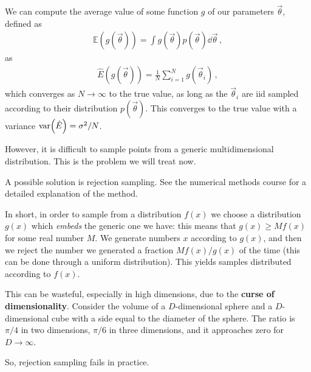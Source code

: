 \documentclass[main.tex]{subfiles}
\begin{document}

We can compute the average value of some function \(g\) of our parameters \(\vec{\theta}\), defined as 
%
\begin{align}
\mathbb{E} (g(\vec{\theta})) = \int g(\vec{\theta}) p(\vec{\theta}) \dd{\vec{\theta}}
\,,
\end{align}
%
as 
%
\begin{align}
\hat{E} (g(\vec{\theta})) = \frac{1}{N} \sum _{i=1}^{N} g(\vec{\theta}_i)
\,,
\end{align}
%
which converges as \(N \to \infty \) to the true value, as long as the \(\vec{\theta}_i\) are iid sampled according to their distribution \(p(\vec{\theta})\).
This converges to the true value with a variance \(\text{var} \qty(\hat{E}) = \sigma^2 / N\). 

However, it is difficult to sample points from a generic multidimensional distribution. 
This is the problem we will treat now. 

A possible solution is rejection sampling. See the numerical methods course for a detailed explanation of the method. 

In short, in order to sample from a distribution \(f(x)\) we choose a distribution \(g(x)\) which \emph{embeds} the generic one we have: this means that \(g(x) \geq M f(x)\) for some real number \(M\). 
We generate numbers \(x\) according to \(g(x)\), and then we reject the number we generated a fraction \(M f(x) / g(x)\) of the time (this can be done through a uniform distribution).
This yields samples distributed according to \(f(x)\).

This can be wasteful, especially in high dimensions, due to the \textbf{curse of dimensionality}. 
Consider the volume of a \(D\)-dimensional sphere and a \(D\)-dimensional cube with a side equal to the diameter of the sphere. 
The ratio is \(\pi /4\) in two dimensions, \(\pi /6\) in three dimensions, and it approaches zero for \(D \to \infty \).

So, rejection sampling fails in practice. 
\end{document}
